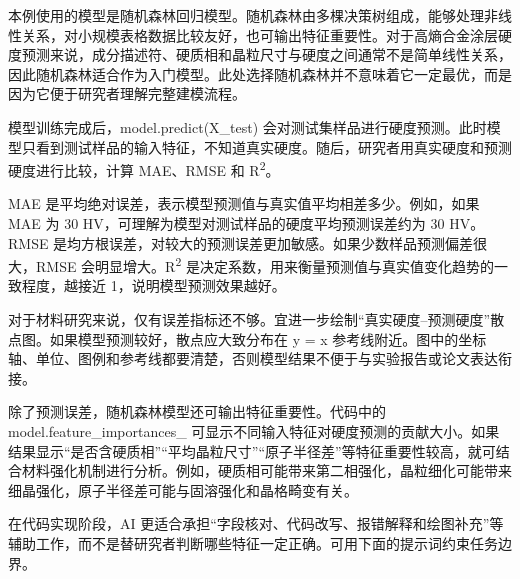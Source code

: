 本例使用的模型是随机森林回归模型。随机森林由多棵决策树组成，能够处理非线性关系，对小规模表格数据比较友好，也可输出特征重要性。对于高熵合金涂层硬度预测来说，成分描述符、硬质相和晶粒尺寸与硬度之间通常不是简单线性关系，因此随机森林适合作为入门模型。此处选择随机森林并不意味着它一定最优，而是因为它便于研究者理解完整建模流程。


模型训练完成后，model.predict(X\_\allowbreak{}test) 会对测试集样品进行硬度预测。此时模型只看到测试样品的输入特征，不知道真实硬度。随后，研究者用真实硬度和预测硬度进行比较，计算 MAE、RMSE 和 R\textsuperscript{2}。


MAE 是平均绝对误差，表示模型预测值与真实值平均相差多少。例如，如果 MAE 为 30 HV，可理解为模型对测试样品的硬度平均预测误差约为 30 HV。RMSE 是均方根误差，对较大的预测误差更加敏感。如果少数样品预测偏差很大，RMSE 会明显增大。R\textsuperscript{2} 是决定系数，用来衡量预测值与真实值变化趋势的一致程度，越接近 1，说明模型预测效果越好。


对于材料研究来说，仅有误差指标还不够。宜进一步绘制“真实硬度--预测硬度”散点图。如果模型预测较好，散点应大致分布在 y = x 参考线附近。图中的坐标轴、单位、图例和参考线都要清楚，否则模型结果不便于与实验报告或论文表达衔接。


除了预测误差，随机森林模型还可输出特征重要性。代码中的 model.feature\_\allowbreak{}importances\_\allowbreak{} 可显示不同输入特征对硬度预测的贡献大小。如果结果显示“是否含硬质相”“平均晶粒尺寸”“原子半径差”等特征重要性较高，就可结合材料强化机制进行分析。例如，硬质相可能带来第二相强化，晶粒细化可能带来细晶强化，原子半径差可能与固溶强化和晶格畸变有关。


在代码实现阶段，AI 更适合承担“字段核对、代码改写、报错解释和绘图补充”等辅助工作，而不是替研究者判断哪些特征一定正确。可用下面的提示词约束任务边界。


